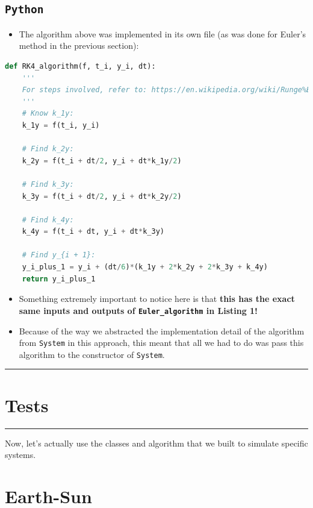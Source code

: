 \documentclass[11pt]{article}
\newcommand{\psection}[1]{{
    \begin{center}
        \noindent \rule{17cm}{0.4pt}
        \section*{\LARGE #1}
        \noindent \rule{17cm}{0.4pt}
    \end{center}
}}
\newcommand{\psubsection}[1]{{\section*{\LARGE #1}}}
\newcommand{\psubsubsection}[1]{{\subsection*{#1}}}
\begin{document}
    \psubsubsection{\texttt{Python}}
    \begin{itemize}
        \item The algorithm above was implemented in its own file (as was done for Euler's method in the previous section):
    \end{itemize}
    \begin{lstlisting}[language=Python, caption=RK4 integration]
def RK4_algorithm(f, t_i, y_i, dt):
    '''
    For steps involved, refer to: https://en.wikipedia.org/wiki/Runge%E2%80%93Kutta_methods.
    '''
    # Know k_1y:
    k_1y = f(t_i, y_i)

    # Find k_2y:
    k_2y = f(t_i + dt/2, y_i + dt*k_1y/2)

    # Find k_3y:
    k_3y = f(t_i + dt/2, y_i + dt*k_2y/2)

    # Find k_4y:
    k_4y = f(t_i + dt, y_i + dt*k_3y)

    # Find y_{i + 1}:
    y_i_plus_1 = y_i + (dt/6)*(k_1y + 2*k_2y + 2*k_3y + k_4y)
    return y_i_plus_1
    \end{lstlisting}
    \begin{itemize}
        \item Something extremely important to notice here is that \textbf{this has the exact same inputs and outputs of \texttt{Euler\_algorithm} in Listing 1!}
        \item Because of the way we abstracted the implementation detail of the algorithm from \texttt{System} in this approach, this meant that all we had to do was pass this algorithm to the constructor of \texttt{System}.
    \end{itemize}

    \newpage

    \psection{Tests}

    \noindent
    Now, let's actually use the classes and algorithm that we built to simulate specific systems.
    \psubsection{Earth-Sun}
\end{document}
